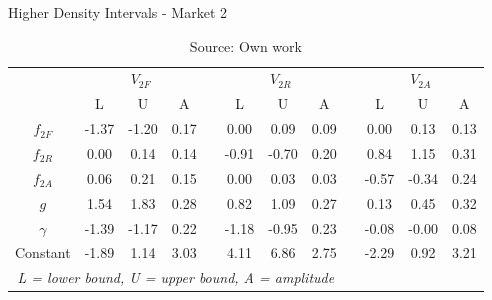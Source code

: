 \begin{table}[H]
\caption{Higher Density Intervals -  Market 2}
\centering
\begin{tabular}{cccccccccccc}
  \toprule
& \multicolumn{3}{c}{$V_{2F}$} && \multicolumn{3}{c}{$V_{2R}$} && \multicolumn{3}{c}{$V_{2A}$}\\ 
\cline{2-4} \cline{6-8} \cline{10-12}
            & L  & U   & A &&  L  & U   & A &&  L  & U   & A\\
  \hline
  $f_{2F}$  & -1.37 & -1.20 & 0.17 && 0.00  & 0.09  & 0.09 && 0.00  & 0.13  & 0.13 \\   
  $f_{2R}$  & 0.00  & 0.14  & 0.14 && -0.91 & -0.70 & 0.20 && 0.84  & 1.15  & 0.31 \\ 
  $f_{2A}$  & 0.06  & 0.21  & 0.15 && 0.00  & 0.03  & 0.03 && -0.57 & -0.34 & 0.24 \\   
  $g$       & 1.54  & 1.83  & 0.28 && 0.82  & 1.09  & 0.27 && 0.13  & 0.45  & 0.32 \\   
  $\gamma$  & -1.39 & -1.17 & 0.22 && -1.18 & -0.95 & 0.23 && -0.08 & -0.00 & 0.08 \\   
  Constant  & -1.89 & 1.14  & 3.03 && 4.11  & 6.86  & 2.75 && -2.29 & 0.92  & 3.21 \\   
  \hline
  \multicolumn{8}{c}{\textit{L = lower bound, U = upper bound, A = amplitude}}\\
  \bottomrule
 \end{tabular}
\caption*{Source: Own work}
\end{table}
